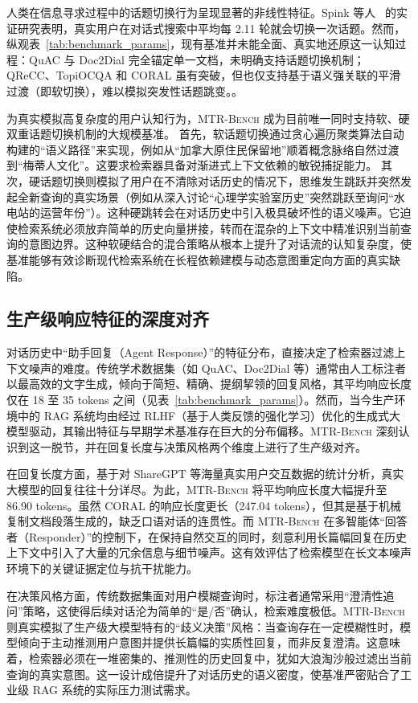 人类在信息寻求过程中的话题切换行为呈现显著的非线性特征。Spink 等人~\citep{spink2002multitasking} 的实证研究表明，真实用户在对话式搜索中平均每 2.11 轮就会切换一次话题。然而，纵观表~\ref{tab:benchmark_params}，现有基准并未能全面、真实地还原这一认知过程：QuAC 与 Doc2Dial 完全锚定单一文档，未明确支持话题切换机制；QReCC、TopiOCQA 和 CORAL 虽有突破，但也仅支持基于语义强关联的平滑过渡（即软切换），难以模拟突发性话题跳变。。

为真实模拟高复杂度的用户认知行为，\textsc{MTR-Bench} 成为目前唯一同时支持软、硬双重话题切换机制的大规模基准。
首先，软话题切换通过贪心遍历聚类算法自动构建的“语义路径”来实现，例如从“加拿大原住民保留地”顺着概念脉络自然过渡到“梅蒂人文化”。这要求检索器具备对渐进式上下文依赖的敏锐捕捉能力。
其次，硬话题切换则模拟了用户在不清除对话历史的情况下，思维发生跳跃并突然发起全新查询的真实场景（例如从深入讨论“心理学实验室历史”突然跳跃至询问“水电站的运营年份”）。这种硬跳转会在对话历史中引入极具破坏性的语义噪声。它迫使检索系统必须放弃简单的历史向量拼接，转而在混杂的上下文中精准识别当前查询的意图边界。这种软硬结合的混合策略从根本上提升了对话流的认知复杂度，使基准能够有效诊断现代检索系统在长程依赖建模与动态意图重定向方面的真实缺陷。

\subsection{生产级响应特征的深度对齐}

对话历史中“助手回复（Agent Response）”的特征分布，直接决定了检索器过滤上下文噪声的难度。传统学术数据集（如 QuAC、Doc2Dial 等）通常由人工标注者以最高效的文字生成，倾向于简短、精确、提纲挈领的回复风格，其平均响应长度仅在 18 至 35 tokens 之间（见表~\ref{tab:benchmark_params}）。然而，当今生产环境中的 RAG 系统均由经过 RLHF（基于人类反馈的强化学习）优化的生成式大模型驱动，其输出特征与早期学术基准存在巨大的分布偏移。\textsc{MTR-Bench} 深刻认识到这一脱节，并在回复长度与决策风格两个维度上进行了生产级对齐。

在回复长度方面，基于对 ShareGPT 等海量真实用户交互数据的统计分析，真实大模型的回复往往十分详尽。为此，\textsc{MTR-Bench} 将平均响应长度大幅提升至 86.90 tokens。虽然 CORAL 的响应长度更长（247.04 tokens），但其是基于机械复制文档段落生成的，缺乏口语对话的连贯性。而 \textsc{MTR-Bench} 在多智能体“回答者（Responder）”的控制下，在保持自然交互的同时，刻意利用长篇幅回复在历史上下文中引入了大量的冗余信息与细节噪声。这有效评估了检索模型在长文本噪声环境下的关键证据定位与抗干扰能力。

在决策风格方面，传统数据集面对用户模糊查询时，标注者通常采用“澄清性追问”策略，这使得后续对话沦为简单的“是/否”确认，检索难度极低。\textsc{MTR-Bench} 则真实模拟了生产级大模型特有的“歧义决策”风格：当查询存在一定模糊性时，模型倾向于主动推测用户意图并提供长篇幅的实质性回复，而非反复澄清。这意味着，检索器必须在一堆密集的、推测性的历史回复中，犹如大浪淘沙般过滤出当前查询的真实意图。这一设计成倍提升了对话历史的语义密度，使基准严密贴合了工业级 RAG 系统的实际压力测试需求。

